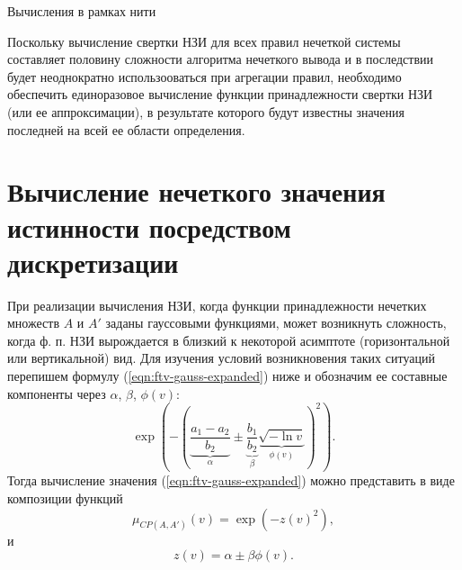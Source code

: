 Вычисления в рамках нити

Поскольку вычисление свертки НЗИ для всех правил нечеткой системы составляет половину сложности алгоритма нечеткого вывода и в последствии будет неоднократно использооваться при агрегации правил, необходимо обеспечить единоразовое вычисление функции принадлежности свертки НЗИ (или ее аппроксимации), в результате которого будут известны значения последней на всей ее области определения.

\section{Вычисление нечеткого значения истинности посредством дискретизации}\label{sec:ch3/sect1}

При реализации вычисления НЗИ, когда функции принадлежности нечетких множеств $A$ и $A'$ заданы гауссовыми функциями, может возникнуть сложность, когда ф. п. НЗИ вырождается в близкий к некоторой асимптоте (горизонтальной или вертикальной) вид. Для изучения условий возникновения таких ситуаций перепишем формулу (\ref{eqn:ftv-gauss-expanded}) ниже и обозначим ее составные компоненты через $\alpha$, $\beta$, $\phi(v)$:
\begin{equation*}
	\exp\left(-\left(\underbrace{\frac{a_1-a_2}{b_2}}_{\alpha}\pm\underbrace{\frac{b_1}{b_2}}_{\beta}\underbrace{\sqrt{-\ln v}}_{\phi(v)}\right)^2\right).
	\label{eqn:ftv-gauss-components-markup}
\end{equation*}
Тогда вычисление значения (\ref{eqn:ftv-gauss-expanded}) можно представить в виде композиции функций
\begin{equation}
	\mu_{CP(A,A')}(v)=\exp(-z(v)^2),
	\label{eqn:ftv-gauss-exp-z}
\end{equation}
и
\begin{equation}
	z(v)=\alpha \pm \beta \phi(v).
	\label{eqn:ftv-gauss-phi}
\end{equation}



